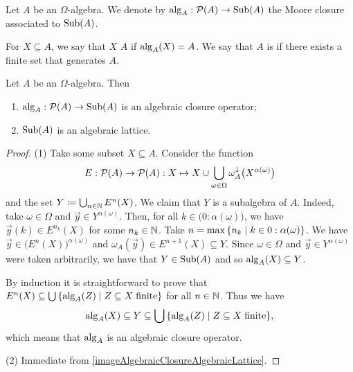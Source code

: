 \begin{definition}
Let $A$ be an $\Omega$-algebra. We denote by $\operatorname{alg}_A: \operatorname{\mathcal{P}}(A)\to \operatorname{Sub}(A)$ the Moore closure associated to $\operatorname{Sub}(A)$.

For $X\subseteq A$, we say that $X$  $A$ if $\operatorname{alg}_A(X) = A$. We say that $A$ is  if there exists a finite set that generates $A$.
\end{definition}

\begin{proposition}
Let $A$ be an $\Omega$-algebra. Then
\begin{enumerate}
\item $\operatorname{alg}_A: \operatorname{\mathcal{P}}(A)\to \operatorname{Sub}(A)$ is an algebraic closure operator;
\item $\operatorname{Sub}(A)$ is an algebraic lattice.
\end{enumerate}
\end{proposition}
\begin{proof}
(1) Take some subset $X\subseteq A$. Consider the function
\[ E:\operatorname{\mathcal{P}}(A)\to \operatorname{\mathcal{P}}(A): X\mapsto X\cup \bigcup_{\omega\in \Omega}\omega_A^\downarrow\big(X^{\alpha(\omega)}\big) \]
and the set $Y \coloneqq \bigcup_{n\in\mathbb{N}}E^n(X)$. We claim that $Y$ is a subalgebra of $A$. Indeed, take $\omega\in \Omega$ and $\vec{y} \in Y^{\alpha(\omega)}$. Then, for all $k\in \big(0:\alpha(\omega)\big)$, we have $\vec{y}(k)\in E^{n_k}(X)$ for some $n_k\in \mathbb{N}$. Take $n = \max\setbuilder{n_k}{k\in 0:\alpha(\omega)}$. We have $\vec{y}\in \big(E^n(X)\big)^{\alpha(\omega)}$ and $\omega_A(\vec{y}) \in E^{n+1}(X) \subseteq Y$. Since $\omega\in \Omega$ and $\vec{y} \in Y^{\alpha(\omega)}$ were taken arbitrarily, we have that $Y\in\operatorname{Sub}(A)$ and so $\operatorname{alg}_A(X)\subseteq Y$.

By induction it is straightforward to prove that $E^n(X) \subseteq \bigcup \setbuilder{\alg_A(Z)}{Z\subseteq X\; \text{finite}}$ for all $n\in \mathbb{N}$. Thus we have
\[ \alg_A(X) \subseteq Y \subseteq \bigcup \setbuilder{\alg_A(Z)}{Z\subseteq X\; \text{finite}}, \]
which means that $\operatorname{alg}_A$ is an algebraic closure operator.

(2) Immediate from \ref{imageAlgebraicClosureAlgebraicLattice}.
\end{proof}

